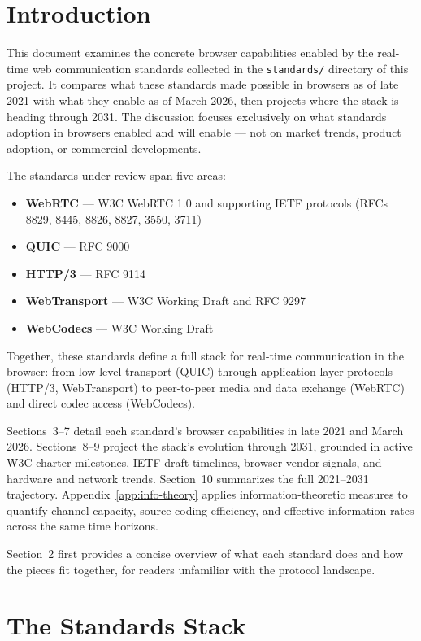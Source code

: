 \documentclass[11pt]{article}
\begin{document}
\section{Introduction}

This document examines the concrete browser capabilities enabled by the
real-time web communication standards collected in the \texttt{standards/}
directory of this project. It compares what these standards made possible in
browsers as of late 2021 with what they enable as of March 2026, then projects
where the stack is heading through 2031. The discussion focuses exclusively on
what standards adoption in browsers enabled and will enable --- not on market
trends, product adoption, or commercial developments.

The standards under review span five areas:
\begin{itemize}
  \item \textbf{WebRTC} --- W3C WebRTC 1.0 and supporting IETF protocols
    (RFCs 8829, 8445, 8826, 8827, 3550, 3711)
  \item \textbf{QUIC} --- RFC 9000
  \item \textbf{HTTP/3} --- RFC 9114
  \item \textbf{WebTransport} --- W3C Working Draft and RFC 9297
  \item \textbf{WebCodecs} --- W3C Working Draft
\end{itemize}

Together, these standards define a full stack for real-time communication in
the browser: from low-level transport (QUIC) through application-layer
protocols (HTTP/3, WebTransport) to peer-to-peer media and data exchange
(WebRTC) and direct codec access (WebCodecs).

Sections~3--7 detail each standard's browser capabilities in late 2021 and
March 2026. Sections~8--9 project the stack's evolution through 2031, grounded
in active W3C charter milestones, IETF draft timelines, browser vendor
signals, and hardware and network trends. Section~10 summarizes the full
2021--2031 trajectory. Appendix~\ref{app:info-theory} applies
information-theoretic measures to quantify channel capacity, source coding
efficiency, and effective information rates across the same time horizons.

Section~2 first provides a concise overview of what each standard does and how
the pieces fit together, for readers unfamiliar with the protocol landscape.

\section{The Standards Stack}
\label{sec:standards-stack}
\end{document}
